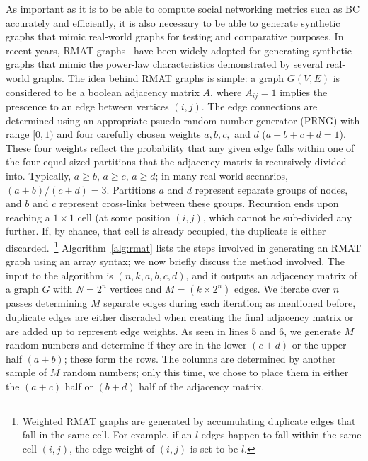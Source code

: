%
As important as it is to be able to compute social networking metrics such as
BC accurately and efficiently, it is also necessary to be able to generate
synthetic graphs that mimic real-world graphs for testing and comparative
purposes.
%
In recent years, RMAT graphs~\cite{Chakrabarti04:Recursive} have been widely
adopted for generating synthetic graphs that mimic the power-law
characteristics demonstrated by several real-world graphs.
%
The idea behind RMAT graphs is simple: a graph $G(V,E)$ is considered to be 
a boolean adjacency matrix $A$, where $A_{ij}=1$ implies the prescence to an 
edge between vertices $(i,j)$.
%
The edge connections are determined using an appropriate psuedo-random number 
generator (PRNG) with range $[0,1)$ and four carefully chosen weights $a,b,c,$
and $d$ ($a+b+c+d=1$).
%
These four weights reflect the probability that any given edge falls within one
of the four equal sized partitions that the adjacency matrix is recursively
divided into.
%
Typically, $a\ge{}b$, $a\ge{}c$, $a\ge{}d$; in many real-world scenarios,
$(a+b)/(c+d)=3$.
%
Partitions $a$ and $d$ represent separate groups of nodes, and $b$ and $c$
represent cross-links between these groups.
%
Recursion ends upon reaching a $1\times{}1$ cell (at some position $(i,j)$,
which cannot be sub-divided any further.
%
If, by chance, that cell is already occupied, the duplicate is either
discarded.~\footnote{Weighted RMAT graphs are generated by accumulating
duplicate edges that fall in the same cell. For example, if an $l$ edges happen
to fall within the same cell $(i,j)$, the edge weight of $(i,j)$ is set to be
$l$.}
%
%
Algorithm~\ref{alg:rmat} lists the steps involved in generating an RMAT graph
using an array syntax; we now briefly discuss the method involved.
%
The input to the algorithm is $(n,k,a,b,c,d)$, and it outputs an adjacency 
matrix of a graph $G$ with $N=2^n$ vertices and $M=(k\times{}2^n)$ edges.
%
We iterate over $n$ passes determining $M$ separate edges during each
iteration; as mentioned before, duplicate edges are either discraded when 
creating the final adjacency matrix or are added up to represent edge weights.
%
As seen in lines $5$ and $6$, we generate $M$ random numbers and determine if
they are in the lower $(c+d)$ or the upper half $(a+b)$; these form the rows.
%
The columns are determined by another sample of $M$ random numbers; only this 
time, we chose to place them in either the $(a+c)$ half or $(b+d)$ half of the 
adjacency matrix.
